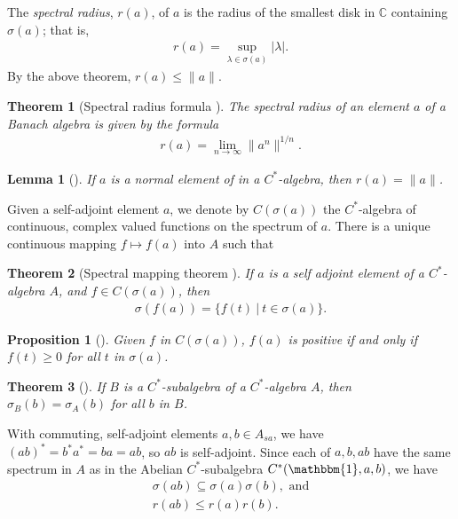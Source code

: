 \documentclass[12pt,a4paper]{report}
\theoremstyle{plain}
\newtheorem*{thm*}{Theorem}
\newtheorem{lemma}{Lemma}
\newtheorem{prop}{Proposition}
\theoremstyle{definition}
\newcommand{\1}{\mathbbm{1}}
\newcommand{\C}{\mathbb{C}}
\newcommand{\spec}[1]{\sigma(#1)}
\begin{document}
The \emph{spectral radius}, $r(a)$, of $a$ is the radius of the smallest disk in $\C$ containing 
$\spec a$; that is, 
\begin{align*}
	r(a)=\sup_{\lambda\in\spec a}{|\lambda|}.
\end{align*}
By the above theorem, $r(a)\leq\|a\|$. 

\begin{thm*}[Spectral radius formula {\cite[3.3.3]{kadison83}}]
	The spectral radius of an element $a$ of a Banach algebra is given by the formula
	\begin{align*}
		r(a)= \lim_{n\to\infty} \|a^n\|^{1/n}.
	\end{align*}
\end{thm*}

\begin{lemma}[{\cite[4.1.1(i)]{kadison83}}]
	If $a$ is a normal element of in a $C^\ast$-algebra, then $r(a)=\|a\|$.
\end{lemma}

Given a self-adjoint element $a$, we denote by $C(\spec a)$ the $C^\ast$-algebra of continuous, complex valued 
functions on the spectrum of $a$. There is a unique continuous mapping $f\mapsto f(a)$ into $A$ such 
that
\begin{thm*}[Spectral mapping theorem {\cite[4.1.6]{kadison83}}]
	If $a$ is a self adjoint element of a $C^\ast$-algebra $A$, and $f\in C(\spec a)$, then
	\begin{align*}
		\spec{f(a)} = \{f(t) ~|~ t \in \spec a\}.
	\end{align*}
\end{thm*}

\begin{prop}[{\cite[4.2.3(i)]{kadison83}}]\label{prop:423}
	Given $f$ in $C(\spec a)$, $f(a)$ is positive if and only if $f(t)\geq0$ for all $t$ in $\spec a$.
\end{prop}

\begin{thm*}[{\cite[4.1.5]{kadison83}}]
	If $B$ is a $C^\ast$-subalgebra of a $C^\ast$-algebra $A$, then $\sigma_B(b) =\sigma_A(b)$ for all 
	$b$ in $B$.
\end{thm*}




With commuting, self-adjoint elements $a,b\in A_{sa}$, we have $(ab)^\ast = b^\ast a^\ast = ba =
ab$, so $ab$ is self-adjoint. Since each of $a,b,ab$ have the same spectrum in $A$ as in the Abelian 
$C^\ast$-subalgebra $C^\ast(\1,a,b)$, we have
\begin{align*}
	\spec{ab} \subseteq \spec{a}\spec{b}, \mbox { and} \\
	r(ab) \leq r(a)r(b).
\end{align*}
\end{document}
